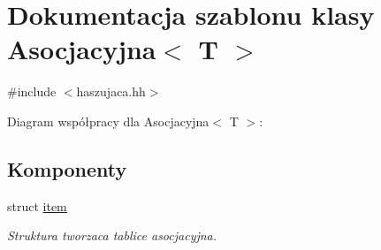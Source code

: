 \hypertarget{class_asocjacyjna}{\section{\-Dokumentacja szablonu klasy \-Asocjacyjna$<$ \-T $>$}
\label{class_asocjacyjna}
}


{\ttfamily \#include $<$haszujaca.\-hh$>$}



\-Diagram współpracy dla \-Asocjacyjna$<$ \-T $>$\-:
\subsection*{\-Komponenty}
\begin{DoxyCompactItemize}
\item 
struct \hyperlink{struct_asocjacyjna_1_1item}{item}
\begin{DoxyCompactList}\small\item\em \-Struktura tworzaca tablice asocjacyjna. \end{DoxyCompactList}\end{DoxyCompactItemize}
